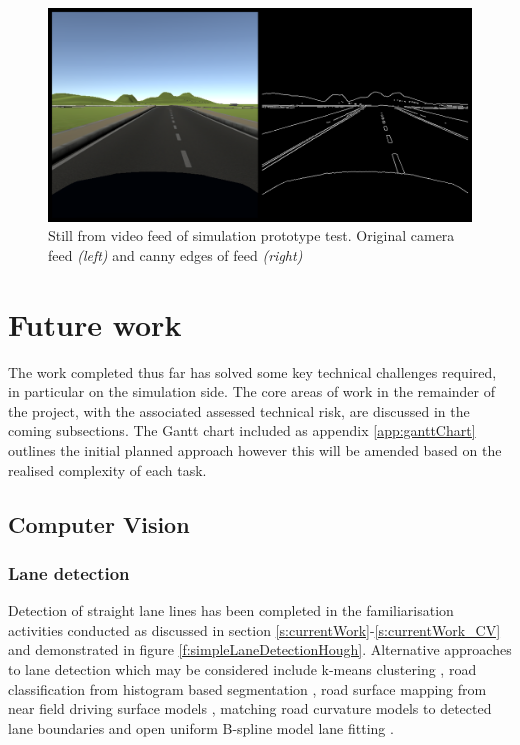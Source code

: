 \documentclass[]{aiaa-tc}%
\begin{document}
\begin{figure}[htb]%
 \includegraphics{simPrototypeIPC.png}
 \caption{Still from video feed of simulation prototype test. Original camera feed \textit{(left)} and canny edges of feed \textit{(right)}}
 \label{f:simPrototypeIPCTest}
\end{figure}

\section{Future work}

The work completed thus far has solved some key technical challenges required, in particular on the simulation side. The core areas of work in the remainder of the project, with the associated assessed technical risk, are discussed in the coming subsections. The Gantt chart included as appendix \ref{app:ganttChart} outlines the initial planned approach however this will be amended based on the realised complexity of each task.

\subsection{Computer Vision}

\subsubsection{Lane detection}

Detection of straight lane lines has been completed in the familiarisation activities conducted as discussed in section \ref{s:currentWork}-\ref{s:currentWork_CV} and demonstrated in figure \ref{f:simpleLaneDetectionHough}. Alternative approaches to lane detection which may be considered include k-means clustering \citep{ipmBasedLaneDetectionApproach}, road classification from histogram based segmentation \citep{histogramSegmentationRoadClassification}, road surface mapping from near field driving surface models \citep{darpaChallengeRoadDetection}, matching road curvature models to detected lane boundaries \citep{intersectionDetectionSingleCamera} and open uniform B-spline model lane fitting \citep{ipmBasedLaneDetectionApproach}.
\end{document}
